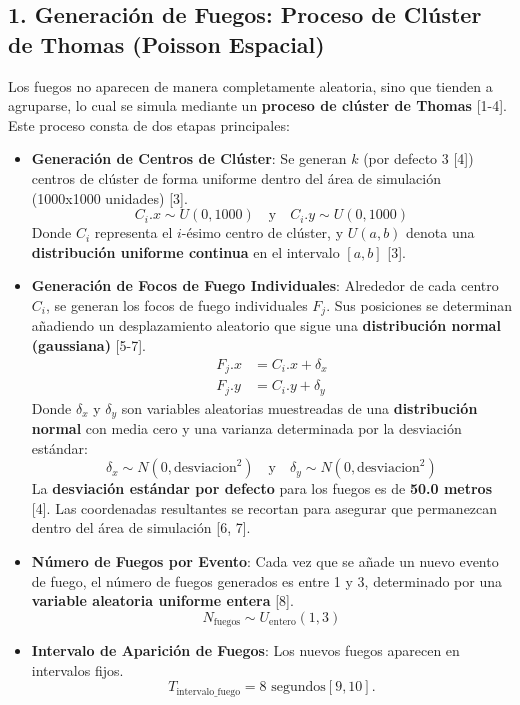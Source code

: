 \documentclass{article}
\begin{document}
\subsection*{1. Generación de Fuegos: Proceso de Clúster de Thomas (Poisson Espacial)}
Los fuegos no aparecen de manera completamente aleatoria, sino que tienden a agruparse, lo cual se simula mediante un \textbf{proceso de clúster de Thomas} [1-4]. Este proceso consta de dos etapas principales:

\begin{itemize}
    \item \textbf{Generación de Centros de Clúster}: Se generan $k$ (por defecto 3 [4]) centros de clúster de forma uniforme dentro del área de simulación (1000x1000 unidades) [3].
    \begin{equation*}
        C_i.x \sim U(0, 1000) \quad \text{y} \quad C_i.y \sim U(0, 1000)
    \end{equation*}
    Donde $C_i$ representa el $i$-ésimo centro de clúster, y $U(a, b)$ denota una \textbf{distribución uniforme continua} en el intervalo $[a, b]$ [3].

    \item \textbf{Generación de Focos de Fuego Individuales}: Alrededor de cada centro $C_i$, se generan los focos de fuego individuales $F_j$. Sus posiciones se determinan añadiendo un desplazamiento aleatorio que sigue una \textbf{distribución normal (gaussiana)} [5-7].
    \begin{align*}
        F_j.x &= C_i.x + \delta_x \\
        F_j.y &= C_i.y + \delta_y
    \end{align*}
    Donde $\delta_x$ y $\delta_y$ son variables aleatorias muestreadas de una \textbf{distribución normal} con media cero y una varianza determinada por la desviación estándar:
    \begin{equation*}
        \delta_x \sim N(0, \text{desviacion}^2) \quad \text{y} \quad \delta_y \sim N(0, \text{desviacion}^2)
    \end{equation*}
    La \textbf{desviación estándar por defecto} para los fuegos es de \textbf{50.0 metros} [4]. Las coordenadas resultantes se recortan para asegurar que permanezcan dentro del área de simulación [6, 7].

    \item \textbf{Número de Fuegos por Evento}: Cada vez que se añade un nuevo evento de fuego, el número de fuegos generados es entre 1 y 3, determinado por una \textbf{variable aleatoria uniforme entera} [8].
    \begin{equation*}
        N_{\text{fuegos}} \sim U_{\text{entero}}(1, 3)
    \end{equation*}

    \item \textbf{Intervalo de Aparición de Fuegos}: Los nuevos fuegos aparecen en intervalos fijos.
    \begin{equation*}
        T_{\text{intervalo\_fuego}} = 8 \text{ segundos} [9, 10].
    \end{equation*}
\end{itemize}
\end{document}
